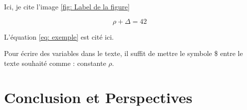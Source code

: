 \documentclass{rapportECC}
\begin{document}
Ici, je cite l'image \ref{fig: Label de la figure}



\begin{equation} \label{eq: exemple}
\rho + \Delta = 42
\end{equation}

L'équation \ref{eq: exemple} est cité ici. 


Pour écrire des variables dans le texte, il suffit de mettre le symbole \$ entre le texte souhaité comme : constante $\rho$. \cite{Companion}

\section{Conclusion et Perspectives}
\lipsum[1-2] \cite{matsumoto_tracking_2013}

\newpage


\printbibliography
\end{document}
